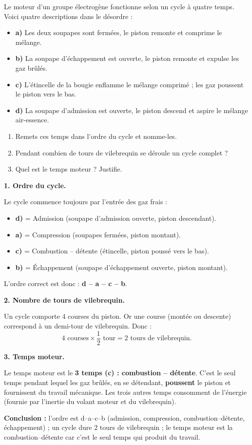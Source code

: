 \documentclass[11pt]{article}
\newcommand{\cle}[1]{{\popxbold\color{popdark}#1}}
\begin{document}
\begin{exoresolu}
Le moteur d'un groupe électrogène fonctionne selon un cycle à quatre temps. Voici quatre descriptions dans le désordre :
\begin{itemize}
\item \textbf{a)} Les deux soupapes sont fermées, le piston remonte et comprime le mélange.
\item \textbf{b)} La soupape d'échappement est ouverte, le piston remonte et expulse les gaz brûlés.
\item \textbf{c)} L'étincelle de la bougie enflamme le mélange comprimé ; les gaz poussent le piston vers le bas.
\item \textbf{d)} La soupape d'admission est ouverte, le piston descend et aspire le mélange air-essence.
\end{itemize}
\begin{enumerate}
\item Remets ces temps dans l'ordre du cycle et nomme-les.
\item Pendant combien de tours de vilebrequin se déroule un cycle complet ?
\item Quel est le temps moteur ? Justifie.
\end{enumerate}
\tcblower
\textbf{1. Ordre du cycle.}

Le cycle commence toujours par l'entrée des gaz frais :
\begin{itemize}
\item \textbf{d)} = \cle{Admission} (soupape d'admission ouverte, piston descendant).
\item \textbf{a)} = \cle{Compression} (soupapes fermées, piston montant).
\item \textbf{c)} = \cle{Combustion -- détente} (étincelle, piston poussé vers le bas).
\item \textbf{b)} = \cle{Échappement} (soupape d'échappement ouverte, piston montant).
\end{itemize}
L'ordre correct est donc : \textbf{d -- a -- c -- b}.

\textbf{2. Nombre de tours de vilebrequin.}

Un cycle comporte 4 courses du piston. Or une course (montée ou descente) correspond à un demi-tour de vilebrequin. Donc :
\[ 4 \text{ courses} \times \frac{1}{2} \text{ tour} = 2 \text{ tours de vilebrequin}. \]

\textbf{3. Temps moteur.}

Le temps moteur est le \textbf{3\ieme{} temps (c) : combustion -- détente}. C'est le seul temps pendant lequel les gaz brûlés, en se détendant, \textbf{poussent} le piston et fournissent du travail mécanique. Les trois autres temps consomment de l'énergie (fournie par l'inertie du volant moteur et du vilebrequin).

\textbf{Conclusion :} l'ordre est d--a--c--b (admission, compression, combustion--détente, échappement) ; un cycle dure 2 tours de vilebrequin ; le temps moteur est la combustion--détente car c'est le seul temps qui produit du travail.
\end{exoresolu}
\end{document}
